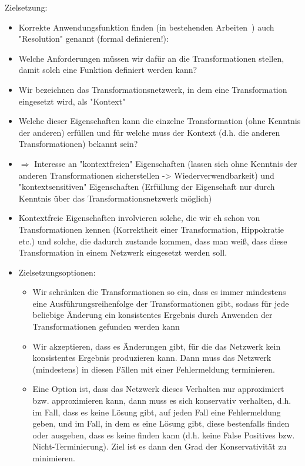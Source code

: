 Zielsetzung:
\begin{itemize}
    \item Korrekte Anwendungsfunktion finden (in bestehenden Arbeiten~\cite{stevens2017a}) auch "Resolution" genannt (formal definieren!):
    \item Welche Anforderungen müssen wir dafür an die Transformationen stellen, damit solch eine Funktion definiert werden kann?
    \item Wir bezeichnen das Transformationsnetzwerk, in dem eine Transformation eingesetzt wird, als "Kontext"
    \item Welche dieser Eigenschaften kann die einzelne Transformation (ohne Kenntnis der anderen) erfüllen und für welche muss der Kontext (d.h. die anderen Transformationen) bekannt sein?
    \item $\Rightarrow$ Interesse an "kontextfreien" Eigenschaften (lassen sich ohne Kenntnis der anderen Transformationen sicherstellen -> Wiederverwendbarkeit) und "kontextsensitiven" Eigenschaften (Erfüllung der Eigenschaft nur durch Kenntnis über das Transformationsnetzwerk möglich)
    \item Kontextfreie Eigenschaften involvieren solche, die wir eh schon von Transformationen kennen (Korrektheit einer Transformation, Hippokratie etc.) und solche, die dadurch zustande kommen, dass man weiß, dass diese Transformation in einem Netzwerk eingesetzt werden soll.
    \item Zielsetzungsoptionen:
    \begin{itemize}
        \item Wir schränken die Transformationen so ein, dass es immer mindestens eine Ausführungsreihenfolge der Transformationen gibt, sodass für jede beliebige Änderung ein konsistentes Ergebnis durch Anwenden der Transformationen gefunden werden kann
        \item Wir akzeptieren, dass es Änderungen gibt, für die das Netzwerk kein konsistentes Ergebnis produzieren kann. Dann muss das Netzwerk (mindestens) in diesen Fällen mit einer Fehlermeldung terminieren.
        \item Eine Option ist, dass das Netzwerk dieses Verhalten nur approximiert bzw. approximieren kann, dann muss es sich konservativ verhalten, d.h. im Fall, dass es keine Lösung gibt, auf jeden Fall eine Fehlermeldung geben, und im Fall, in dem es eine Lösung gibt, diese bestenfalls finden oder ausgeben, dass es keine finden kann (d.h. keine False Positives bzw. Nicht-Terminierung). Ziel ist es dann den Grad der Konservativität zu minimieren.

\end{itemize}
\end{itemize}
